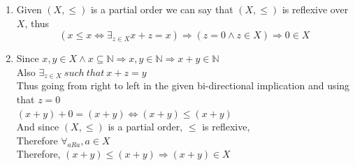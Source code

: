 \documentclass[12pt]{article}
\newcommand{\N}{\mathbb{N}}
\newenvironment{solution}[2][Solution]{ \begin{trivlist}
\item[\hskip \labelsep {\bfseries #1}]}{\end{trivlist}}
\begin{document}
\begin{solution}{7}
\item[]
\begin{enumerate}[label=\alph*)]
    \item Given $(X,\le)$ is a partial order we can say that $(X,\le)$ is reflexive over $X$,
    thus $$(x \le x \Leftrightarrow \exists_{z \in X} x+z=x) \Rightarrow (z = 0 \wedge z \in X) \Rightarrow 0 \in X$$
    \item Since $x,y \in X \wedge x \subseteq \N \Rightarrow x,y \in \N \Rightarrow x+y \in \N$\\
    Also $\exists_{z \in X}\ such\  that\ x + z = y$\\
    Thus going from right to left in the given bi-directional implication and using that $z=0$ \\
    $(x+y) + 0 = (x+y) \Leftrightarrow (x+y) \le (x+y)$\\ And since $(X, \le)$ is a partial order, $\le$ is reflexive,\\ 
    Therefore $\forall_{aRa}, a \in X$\\
    Therefore, $(x+y) \le (x+y) \Rightarrow (x+y) \in X$
\end{enumerate}
\end{solution}

\vskip 0.5in
\end{document}
